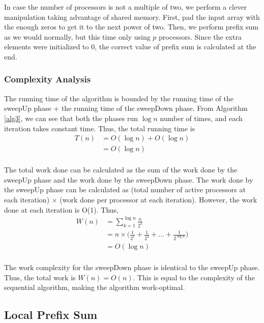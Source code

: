 \documentclass[11pt]{article}
\begin{document}
In case the number of processors is not a multiple of two, we perform a clever manipulation taking advantage of shared memory. First, pad the input array with the enough zeros to get it to the next power of two. Then, we perform prefix sum as we would normally, but this time only using $p$ processors. Since the extra elements were initialized to 0, the correct value of prefix sum is calculated at the end.

\subsubsection{Complexity Analysis}
The running time of the algorithm is bounded by the running time of the sweepUp phase + the running time of the sweepDown phase. From Algorithm \ref{alg3}, we can see that both the phases run $\log n$ number of times, and each iteration takes constant time. Thus, the total running time is
\begin{align*} 
T(n) &= O(\log n) + O(\log n)  \\ 
&= O(\log n)  \\
\end{align*}

\noindent The total work done can be calculated as the sum of the work done by the sweepUp phase and the work done by the sweepDown phase. The work done by the sweepUp phase can be calculated as (total number of active processors at each iteration) $\times$ (work done per processor at each iteration). However, the work done at each iteration is O(1). Thus,
\begin{align*} 
W(n) &= \sum\limits_{k=1}^{\log n} \frac{n}{2^{k}}  \\ 
&= n\times\bigg(\frac{1}{2^{1}} + \frac{1}{2^{2}} + \ldots + \frac{1}{2^{\log n}}\bigg)  \\
&= O(\log n)  \\
\end{align*}

The work complexity for the sweepDown phase is identical to the sweepUp phase. Thus, the total work is \(W(n) = O(n)\). This is equal to the complexity of the sequential algorithm, making the algorithm work-optimal.

\subsection{Local Prefix Sum}
\end{document}
